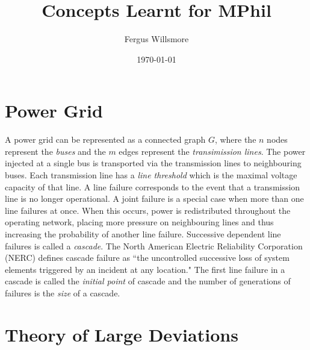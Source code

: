 \documentclass{article}
\title{Concepts Learnt for MPhil}
\author{Fergus Willsmore}
\date{\today}
\begin{document}
\maketitle

\newpage

\tableofcontents

\newpage

\section{Power Grid}

A power grid can be represented as a connected graph $G$, where the $n$ nodes represent the \textit{buses} and the $m$ edges represent the \textit{transimission lines}. The power injected at a single bus is transported via the transmission lines to neighbouring buses. Each transmission line has a {\it line threshold} which is the maximal voltage capacity of that line. A line failure corresponds to the event that a transmission line is no longer operational. A joint failure is a special case when more than one line failures at once. When this occurs, power is redistributed throughout the operating network, placing more pressure on neighbouring lines and thus increasing the probability of another line failure. Successive dependent line failures is called a \textit{cascade}. The North American Electric Reliability Corporation (NERC) defines cascade failure as ``the uncontrolled successive loss of system elements triggered by an incident at any location." The first line failure in a cascade is called the {\it initial point} of cascade and the number of generations of failures is the {\it size} of a cascade.

\section{Theory of Large Deviations}
\end{document}

